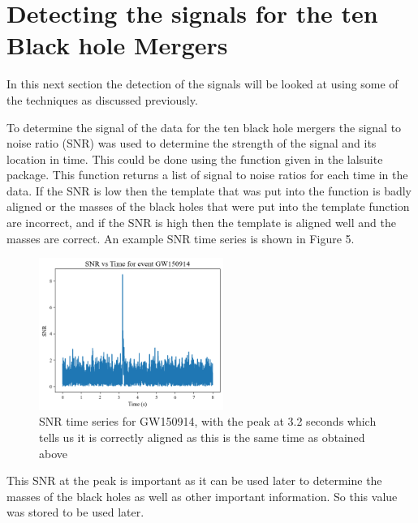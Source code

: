 \documentclass[]{article}
\begin{document}
\section*{Detecting the signals for the ten Black hole Mergers}
In this next section the detection of the signals will be looked at using some of the
techniques as discussed previously.

To determine the signal of the data for the ten black hole mergers the signal
to noise ratio (SNR) was used to determine the strength of the signal and its location in time.
This could be done using the function given in the lalsuite package. This function
returns a list of signal to noise ratios for each time in the data. If the SNR is low then the
template that was put into the function is badly aligned or the masses of the black holes
that were put into the template function are incorrect, and if the SNR is high
then the template is aligned well and the masses are correct. An example SNR time series
is shown in Figure 5.
\begin{figure}[h]
    \includegraphics[width=6cm]{images/SNR_gw150914.png}
    \caption{SNR time series for GW150914, with the peak at 3.2 seconds which tells
    us it is correctly aligned as this is the same time as obtained above}
    \label{fig:SNR}
\end{figure}
This SNR at the peak is important as it can be used later to determine the masses of the
black holes as well as other important information. So this value was stored to be used later.
\end{document}
